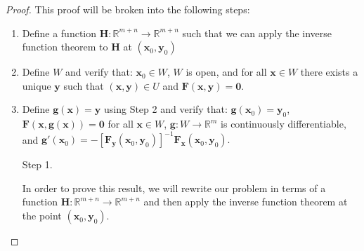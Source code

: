 \documentclass{article}
\newcommand{\R}{\mathbb{R}}
\newcommand{\x}{\mathbf{x}}
\newcommand{\F}{\mathbf{F}}
\newcommand{\y}{\mathbf{y}}
\newcommand{\g}{\mathbf{g}}
\newcommand{\ze}{\mathbf{0}}
\theoremstyle{definition}
\begin{document}
\begin{proof}
	This proof will be broken into the following steps: 
	\begin{enumerate}
	\item Define a function $ \mathbf H:\R^{m+n}\to \R^{m+n} $ such that we can apply the inverse function theorem to $ \mathbf H $ at $ (\x_0,\y_0) $
	\item Define $ W $ and verify that: $ \x_0\in W $, $ W $ is open, and for all $ \x\in W $ there exists a unique $ \y $ such that $ (\x,\y)\in U $ and $ \F(\x,\y)=\ze $. 
	\item Define $ \g(\x) =\y$ using Step 2 and verify that: $ \g(\x_0)=\y_0 $, $ \mathbf F(\x,\g(\x))=\ze $ for all $ \x\in W $,  $ \mathbf g:W\to\R^m $ is continuously differentiable, and
	$ \g'(\x_0) = -[\mathbf F_\y(\x_0,\y_0)]^{-1}\mathbf F_\x(\x_0,\y_0).$
	\end{enumerate}
\begin{enumerate}
	\item [Step 1.]

	In order to prove this result, we will rewrite our problem in terms of a function $ \mathbf H:\R^{m+n}\to \R^{m+n} $ and then apply the inverse function theorem at the point $ (\x_0,\y_0) $. 
	

\end{enumerate}
\end{proof}
\end{document}
